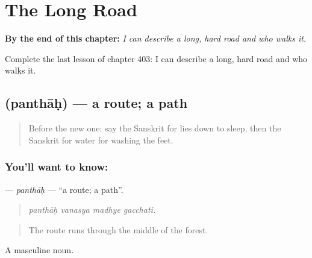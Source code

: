 
\chapter{The Long Road}
\label{ch:sa-the-long-road}

\begin{chapteropening}
\textbf{By the end of this chapter:} \emph{I can describe a long, hard road and who walks it.}

Complete the last lesson of chapter 403: I can describe a long, hard road and who walks it.
\end{chapteropening}

\section[\texorpdfstring{\sk{पन्थाः} (panthāḥ)}{पन्थाः (panthāḥ)}]{ (panthāḥ) — a route; a path}

\label{lesson:SA-C403-panthah}



\begin{quote}
Before the new one: say the Sanskrit for lies down to sleep, then the Sanskrit for water for washing the feet.
\end{quote}

\subsection*{You'll want to know: }
\textbf{} — \emph{panthāḥ} — \textquotedblleft{}a route; a path\textquotedblright{}.

\begin{quote}
   
\end{quote}

\begin{quote}
\emph{panthāḥ vanasya madhye gacchati.}
\end{quote}

\begin{quote}
The route runs through the middle of the forest.
\end{quote}

A masculine noun.

